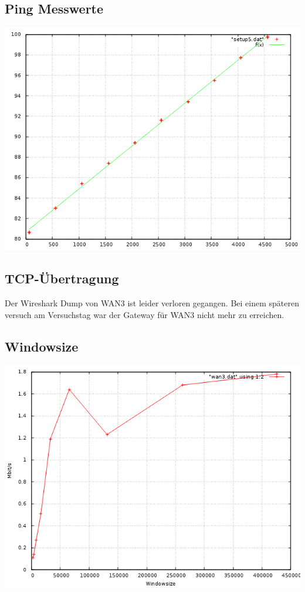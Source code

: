 \documentclass[a4paper,10pt]{article}
\begin{document}
\subsection{Ping Messwerte}
\includegraphics[scale=0.75]{ping_setup_wan3.png}


\subsection{TCP-Übertragung}
Der Wireshark Dump von WAN3 ist leider verloren gegangen. Bei einem späteren versuch am Versuchstag war der Gateway für WAN3 nicht mehr zu erreichen.

\subsection{Windowsize}
\includegraphics[scale=0.75]{wan3_windows.png}
\end{document}
